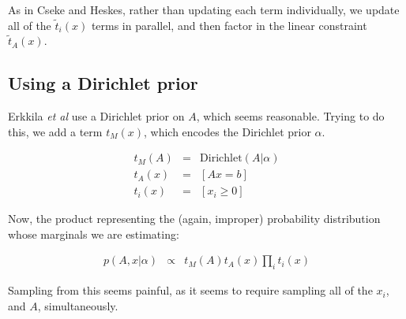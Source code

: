 \documentclass{article}
\begin{document}
As in Cseke and Heskes, rather than updating each term individually,
we update all of the $\tilde{t}_i(x)$ terms in parallel, and then factor in
the linear constraint $\tilde{t}_A(x)$.


\subsection{Using a Dirichlet prior}

Erkkila {\em et al} use a Dirichlet prior on $A$, which seems reasonable. Trying to do
this, we add a term $t_M(x)$, which encodes the Dirichlet prior $\alpha$.

\begin{eqnarray}
t_M(A) & = & \mathrm{Dirichlet}(A|\alpha) \\
t_A(x) & = & [Ax = b] \\
t_i(x) & = & [x_i \ge 0]
\end{eqnarray}

Now, the product representing the (again, improper) probability distribution
whose marginals we are estimating:

\begin{eqnarray}
p(A, x|\alpha) & \propto & t_M(A) t_A(x) \prod_i t_i(x)
\end{eqnarray}

Sampling from this seems painful, as it seems to require sampling all of
the $x_i$, and $A$, simultaneously.
\end{document}
